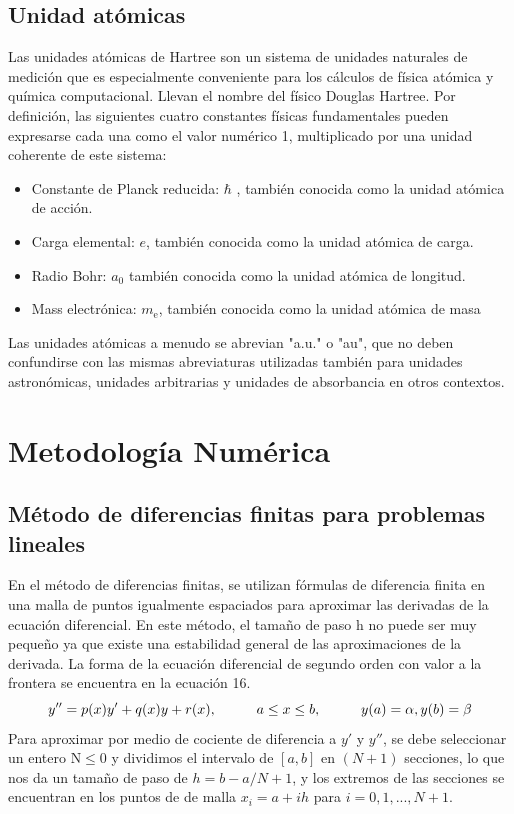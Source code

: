 \documentclass[12pt,twoside]{extarticle}
\begin{document}
\subsection{Unidad atómicas}
Las unidades atómicas de Hartree son un sistema de unidades naturales de medición que es especialmente conveniente para los cálculos de física atómica y química computacional. Llevan el nombre del físico Douglas Hartree. Por definición, las siguientes cuatro constantes físicas fundamentales pueden expresarse cada una como el valor numérico 1, multiplicado por una unidad coherente de este sistema:

\begin{itemize}
    \item  Constante de Planck reducida: $\hbar$ , también conocida como la unidad atómica de acción.
\item Carga elemental: $e$, también conocida como la unidad atómica de carga.
\item Radio Bohr: $a_{0}$ también conocida como la unidad atómica de longitud.
\item Mass electrónica: $m_{\text{e}}$, también conocida como la unidad atómica de masa
\end{itemize}

Las unidades atómicas a menudo se abrevian "a.u." o "au", que no deben confundirse con las mismas abreviaturas utilizadas también para unidades astronómicas, unidades arbitrarias y unidades de absorbancia en otros contextos.
\section{Metodología Numérica}
\subsection{Método de diferencias finitas para problemas lineales}

En el método de diferencias finitas, se utilizan fórmulas de diferencia finita en una malla de puntos igualmente espaciados para  aproximar las derivadas de la ecuación diferencial. En este método, el tamaño de paso h no puede ser muy pequeño ya que existe una estabilidad general de las aproximaciones de la derivada. La forma de la ecuación diferencial de segundo orden con valor a la frontera se encuentra en la ecuación 16.
\begin{equation}
    y''=p(x)y'+q(x)y+r(x),\hspace{10mm}a\leq x\leq b,\hspace{10mm}y(a)=\alpha, y(b)=\beta
\end{equation}
 Para aproximar por medio de cociente de diferencia a $y'$ y $y''$, se debe seleccionar un entero N$\leq$0 y dividimos el intervalo de $[a,b]$ en $(N+1)$ secciones, lo que nos da un tamaño de paso de $h=b-a/N+1$, y los extremos de las secciones se encuentran en los puntos de de malla $x_i=a+ih$ para $i=0,1,...,N+1$.
\end{document}
